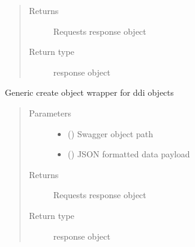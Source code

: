 \documentclass[letterpaper,10pt,english]{sphinxmanual}
\begin{document}
\begin{fulllineitems}
\begin{fulllineitems}
\begin{quote}
\begin{description}
\begin{itemize}
\end{itemize}

\item[{Returns}] \leavevmode
\sphinxAtStartPar
Requests response object

\item[{Return type}] \leavevmode
\sphinxAtStartPar
response object

\end{description}\end{quote}

\end{fulllineitems}


\begin{fulllineitems}
\label{\detokenize{b1cdc-class:bloxone.b1cdc.create}}
\sphinxAtStartPar
Generic create object wrapper for ddi objects
\begin{quote}\begin{description}
\item[{Parameters}] \leavevmode\begin{itemize}
\item {} 
\sphinxAtStartPar
{} () \textendash{} Swagger object path

\item {} 
\sphinxAtStartPar
{} () \textendash{} JSON formatted data payload

\end{itemize}

\item[{Returns}] \leavevmode
\sphinxAtStartPar
Requests response object

\item[{Return type}] \leavevmode
\sphinxAtStartPar
response object

\end{description}\end{quote}

\end{fulllineitems}



\end{fulllineitems}
\end{document}
